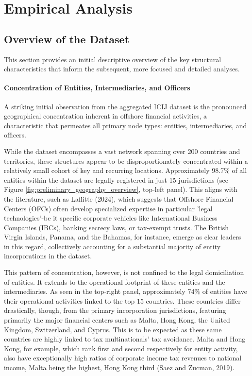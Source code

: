\chapter{Empirical Analysis}
\label{chap:empirical_analysis}

\section{Overview of the Dataset}
\label{subsec:overview_dataset}

This section provides an initial descriptive overview of the key structural characteristics that inform the subsequent, more focused and detailed analyses. 

\subsubsection{Concentration of Entities, Intermediaries, and Officers}

\label{subsubsec:concentration_elements}
A striking initial observation from the aggregated ICIJ dataset is the pronounced geographical concentration inherent in offshore financial activities, a characteristic that permeates all primary node types: entities, intermediaries, and officers.

While the dataset encompasses a vast network spanning over 200 countries and territories, these structures appear to be disproportionately concentrated within a relatively small cohort of key and recurring locations. Approximately 98.7\% of all entities within the dataset are legally registered in just 15 jurisdictions (see Figure \ref{fig:preliminary_geography_overview}, top-left panel). This aligns with the literature, such as Laffitte (2024), which suggests that Offshore Financial Centers (OFCs) often develop specialized expertise in particular 'legal technologies'-be it specific corporate vehicles like International Business Companies (IBCs), banking secrecy laws, or tax-exempt trusts. The British Virgin Islands, Panama, and the Bahamas, for instance, emerge as clear leaders in this regard, collectively accounting for a substantial majority of entity incorporations in the dataset.

This pattern of concentration, however, is not confined to the legal domiciliation of entities. It extends to the operational footprint of these entities and the intermediaries. As seen in the top-right panel, approximately 74\% of entities have their operational activities linked to the top 15 countries. These countries differ drastically, though, from the primary incorporation jurisdictions, featuring primarily the major financial centers such as Malta, Hong Kong, the United Kingdom, Switzerland, and Cyprus. This is to be expected as these same countries are highly linked to tax multinationals' tax avoidance. Malta and Hong Kong, for example, which rank first and second respectively for entity activity, also have exceptionally high ratios of corporate income tax revenues to national income, Malta being the highest, Hong Kong third (Saez and Zucman, 2019). 

